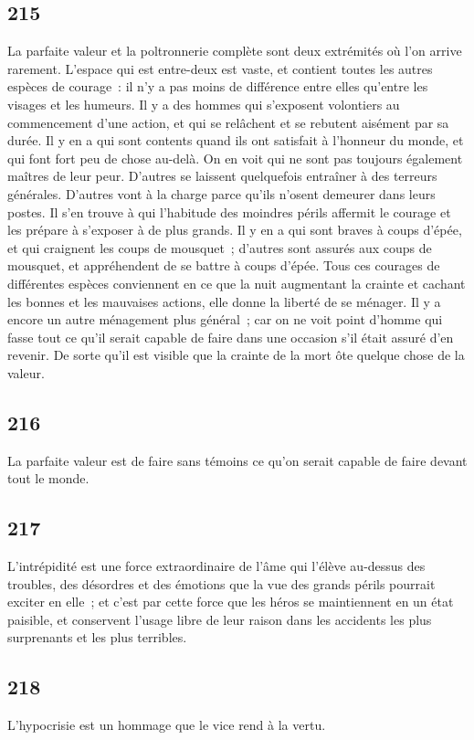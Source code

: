 \documentclass[french,twoside]{book} %
\begin{document}
\subsection[{215}]{ \textsc{215} }
\noindent La parfaite valeur et la poltronnerie complète sont deux extrémités où l’on arrive rarement. L’espace qui est entre-deux est vaste, et contient toutes les autres espèces de courage : il n’y a pas moins de différence entre elles qu’entre les visages et les humeurs. Il y a des hommes qui s’exposent volontiers au commencement d’une action, et qui se relâchent et se rebutent aisément par sa durée. Il y en a qui sont contents quand ils ont satisfait à l’honneur du monde, et qui font fort peu de chose au-delà. On en voit qui ne sont pas toujours également maîtres de leur peur. D’autres se laissent quelquefois entraîner à des terreurs générales. D’autres vont à la charge parce qu’ils n’osent demeurer dans leurs postes. Il s’en trouve à qui l’habitude des moindres périls affermit le courage et les prépare à s’exposer à de plus grands. Il y en a qui sont braves à coups d’épée, et qui craignent les coups de mousquet ; d’autres sont assurés aux coups de mousquet, et appréhendent de se battre à coups d’épée. Tous ces courages de différentes espèces conviennent en ce que la nuit augmentant la crainte et cachant les bonnes et les mauvaises actions, elle donne la liberté de se ménager. Il y a encore un autre ménagement plus général ; car on ne voit point d’homme qui fasse tout ce qu’il serait capable de faire dans une occasion s’il était assuré d’en revenir. De sorte qu’il est visible que la crainte de la mort ôte quelque chose de la valeur.
\subsection[{216}]{ \textsc{216} }
\noindent La parfaite valeur est de faire sans témoins ce qu’on serait capable de faire devant tout le monde.
\subsection[{217}]{ \textsc{217} }
\noindent L’intrépidité est une force extraordinaire de l’âme qui l’élève au-dessus des troubles, des désordres et des émotions que la vue des grands périls pourrait exciter en elle ; et c’est par cette force que les héros se maintiennent en un état paisible, et conservent l’usage libre de leur raison dans les accidents les plus surprenants et les plus terribles.
\subsection[{218}]{ \textsc{218} }
\noindent L’hypocrisie est un hommage que le vice rend à la vertu.
\end{document}
